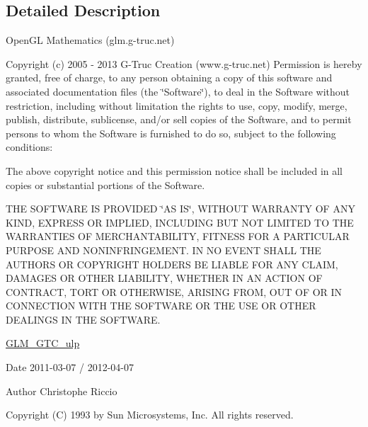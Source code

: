 \subsection{Detailed Description}
Open\+G\+L Mathematics (glm.\+g-\/truc.\+net)

Copyright (c) 2005 -\/ 2013 G-\/\+Truc Creation (www.\+g-\/truc.\+net) Permission is hereby granted, free of charge, to any person obtaining a copy of this software and associated documentation files (the \char`\"{}\+Software\char`\"{}), to deal in the Software without restriction, including without limitation the rights to use, copy, modify, merge, publish, distribute, sublicense, and/or sell copies of the Software, and to permit persons to whom the Software is furnished to do so, subject to the following conditions\+:

The above copyright notice and this permission notice shall be included in all copies or substantial portions of the Software.

T\+H\+E S\+O\+F\+T\+W\+A\+R\+E I\+S P\+R\+O\+V\+I\+D\+E\+D \char`\"{}\+A\+S I\+S\char`\"{}, W\+I\+T\+H\+O\+U\+T W\+A\+R\+R\+A\+N\+T\+Y O\+F A\+N\+Y K\+I\+N\+D, E\+X\+P\+R\+E\+S\+S O\+R I\+M\+P\+L\+I\+E\+D, I\+N\+C\+L\+U\+D\+I\+N\+G B\+U\+T N\+O\+T L\+I\+M\+I\+T\+E\+D T\+O T\+H\+E W\+A\+R\+R\+A\+N\+T\+I\+E\+S O\+F M\+E\+R\+C\+H\+A\+N\+T\+A\+B\+I\+L\+I\+T\+Y, F\+I\+T\+N\+E\+S\+S F\+O\+R A P\+A\+R\+T\+I\+C\+U\+L\+A\+R P\+U\+R\+P\+O\+S\+E A\+N\+D N\+O\+N\+I\+N\+F\+R\+I\+N\+G\+E\+M\+E\+N\+T. I\+N N\+O E\+V\+E\+N\+T S\+H\+A\+L\+L T\+H\+E A\+U\+T\+H\+O\+R\+S O\+R C\+O\+P\+Y\+R\+I\+G\+H\+T H\+O\+L\+D\+E\+R\+S B\+E L\+I\+A\+B\+L\+E F\+O\+R A\+N\+Y C\+L\+A\+I\+M, D\+A\+M\+A\+G\+E\+S O\+R O\+T\+H\+E\+R L\+I\+A\+B\+I\+L\+I\+T\+Y, W\+H\+E\+T\+H\+E\+R I\+N A\+N A\+C\+T\+I\+O\+N O\+F C\+O\+N\+T\+R\+A\+C\+T, T\+O\+R\+T O\+R O\+T\+H\+E\+R\+W\+I\+S\+E, A\+R\+I\+S\+I\+N\+G F\+R\+O\+M, O\+U\+T O\+F O\+R I\+N C\+O\+N\+N\+E\+C\+T\+I\+O\+N W\+I\+T\+H T\+H\+E S\+O\+F\+T\+W\+A\+R\+E O\+R T\+H\+E U\+S\+E O\+R O\+T\+H\+E\+R D\+E\+A\+L\+I\+N\+G\+S I\+N T\+H\+E S\+O\+F\+T\+W\+A\+R\+E.

\hyperlink{group__gtc__ulp}{G\+L\+M\+\_\+\+G\+T\+C\+\_\+ulp}

\begin{DoxyDate}{Date}
2011-\/03-\/07 / 2012-\/04-\/07 
\end{DoxyDate}
\begin{DoxyAuthor}{Author}
Christophe Riccio
\end{DoxyAuthor}
Copyright (C) 1993 by Sun Microsystems, Inc. All rights reserved.


